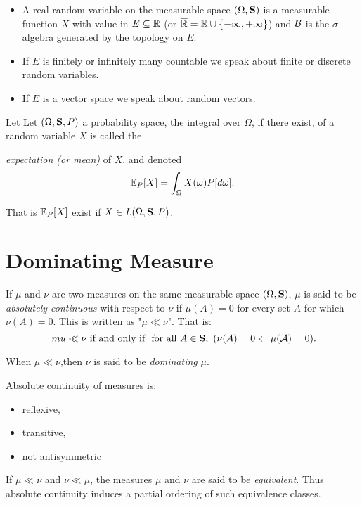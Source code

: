 \begin{itemize}
\item A real random variable on the measurable space $(\Omega,\mathbf{S})$ is a measurable
function $X$ with value in $E \subseteq\mathbb{R}$ (or $\overline{\mathbb{R}}=\mathbb{R}\cup\{-\infty,+\infty\}$) and $\mathcal{B}$ is the $\sigma$-algebra generated by the topology on $E$. \\

\item If $E$ is finitely or infinitely many
countable we speak about finite or discrete random variables.\\

\item If $E$ is a vector space we speak about random vectors.
\end{itemize}

Let Let $(\Omega, \mathbf{S},P)$ a probability space, the integral over $\Omega$, if there exist, of a random variable $X$  is called the {\emph{expectation (or mean)} of $X$, and denoted 
\[
\mathbb{E}_P[X]=\int_\Omega X(\omega) P[d\omega].
\]

That is $\mathbb{E}_P[X]$ exist if $X\in L(\Omega,\mathbf{S},P)$.




\section{Dominating Measure}

\begin{definition}
If $ \mu $ and $ \nu$ are two measures on the same measurable space  $(\Omega,\mathbf{S})$,
$\mu $ is said to be \emph{absolutely continuous} with respect to $ \nu $ if $ \mu ( A)=0$ for every set 
$A$ for which $\nu (A)=0$. This is written as "$ \mu \ll \nu $". That is:
\[\
mu\ll \nu \text{ if and only if  \  for all } A \in \mathbf{S}, \ (\nu (A)=0 \Leftarrow  \mu (\mathcal{A})=0).
\]

When $ \mu \ll \nu $,then $\nu $ is said to be \emph{dominating} $ \mu $.
\end{definition}

Absolute continuity of measures is:
\begin{itemize}
\item reflexive, 
\item transitive, 
\item not antisymmetric
\end{itemize}

\vspace{3pt}
If $ \mu \ll \nu $ and $ \nu \ll \mu$, the measures $ \mu $ and $\nu $ are said to be \emph{equivalent}. 
Thus absolute continuity induces a partial ordering of such equivalence classes.

}
